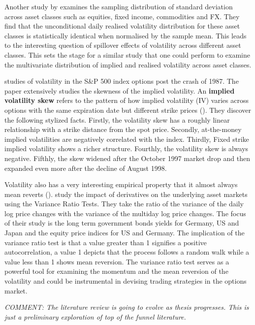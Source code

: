 Another study by \cite{bollerslev2017} examines the sampling distribution of standard deviation across asset classes such as equities, fixed income, commodities and FX. They find that the unconditional daily realised volatility distribution for these asset classes is statistically identical when normalised by the sample mean. This leads to the interesting question of spillover effects of volatility across different asset classes. This sets the stage for a similar study that one could perform to examine the multivariate distribution of implied and realised volatility across asset classes.

\cite{derman1999} studies of volatility in the S\&P 500 index options post the crash of 1987.  The paper extensively studies the skewness of the implied volatility. An \textbf{implied volatility skew} refers to the pattern of how implied volatility (IV) varies across options with the same expiration date but different strike prices (\cite{derman1999}). They discover the following stylized facts. Firstly, the volatility skew has a roughly linear relationship with a strike distance from the spot price.  Secondly, at-the-money implied volatilities are negatively correlated with the index. Thirdly, Fixed strike implied volatility shows a richer structure. Fourthly, the volatility skew is always negative. Fifthly, the skew widened after the October 1997 market drop and then expanded even more after the decline of August 1998.

Volatility also has a very interesting empirical property that it almost always mean reverts (\cite{stein1989overreactions}). \cite{Cohen1996} study the impact of derivatives on the underlying asset markets using the Variance Ratio Tests. They take the ratio of the variance of the daily log price changes with the variance of the multiday log price changes. The focus of their study is the long term government bonds yields for Germany, US and Japan and the equity price indices for US and Germany. The implication of the variance ratio test is that a value greater than 1 signifies a positive autocorrelation, a value 1 depicts that the process follows a random walk while a value less than 1 shows mean reversion. The variance ratio test serves as a powerful tool for examining the momentum and the mean reversion of the volatility and could be instrumental in devising trading strategies in the options market.

\textit{COMMENT: The literature review is going to evolve as thesis progresses. This is just a preliminary exploration of top of the funnel literature.}